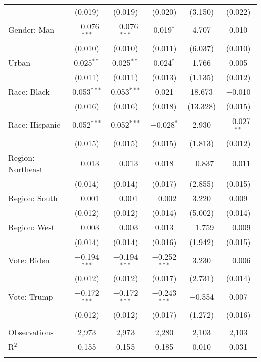 \begin{tabular}{@{\extracolsep{5pt}}lccccc}
  & (0.019) & (0.019) & (0.020) & (3.150) & (0.022) \\ 
  Gender: Man & $-$0.076$^{***}$ & $-$0.076$^{***}$ & 0.019$^{*}$ & 4.707 & 0.010 \\ 
  & (0.010) & (0.010) & (0.011) & (6.037) & (0.010) \\ 
  Urban & 0.025$^{**}$ & 0.025$^{**}$ & 0.024$^{*}$ & 1.766 & 0.005 \\ 
  & (0.011) & (0.011) & (0.013) & (1.135) & (0.012) \\ 
  Race: Black & 0.053$^{***}$ & 0.053$^{***}$ & 0.021 & 18.673 & $-$0.010 \\ 
  & (0.016) & (0.016) & (0.018) & (13.328) & (0.015) \\ 
  Race: Hispanic & 0.052$^{***}$ & 0.052$^{***}$ & $-$0.028$^{*}$ & 2.930 & $-$0.027$^{**}$ \\ 
  & (0.015) & (0.015) & (0.015) & (1.813) & (0.012) \\ 
  Region: Northeast & $-$0.013 & $-$0.013 & 0.018 & $-$0.837 & $-$0.011 \\ 
  & (0.014) & (0.014) & (0.017) & (2.855) & (0.015) \\ 
  Region: South & $-$0.001 & $-$0.001 & $-$0.002 & 3.220 & 0.009 \\ 
  & (0.012) & (0.012) & (0.014) & (5.002) & (0.014) \\ 
  Region: West & $-$0.003 & $-$0.003 & 0.013 & $-$1.759 & $-$0.009 \\ 
  & (0.014) & (0.014) & (0.016) & (1.942) & (0.015) \\ 
  Vote: Biden & $-$0.194$^{***}$ & $-$0.194$^{***}$ & $-$0.252$^{***}$ & 3.230 & $-$0.006 \\ 
  & (0.012) & (0.012) & (0.017) & (2.731) & (0.014) \\ 
  Vote: Trump & $-$0.172$^{***}$ & $-$0.172$^{***}$ & $-$0.243$^{***}$ & $-$0.554 & 0.007 \\ 
  & (0.012) & (0.012) & (0.017) & (1.272) & (0.016) \\ 
 \hline \\[-1.8ex] 

Observations & 2,973 & 2,973 & 2,280 & 2,103 & 2,103 \\ 
R$^{2}$ & 0.155 & 0.155 & 0.185 & 0.010 & 0.031 \\ 
\hline 
\hline \\[-1.8ex] 
\end{tabular} 